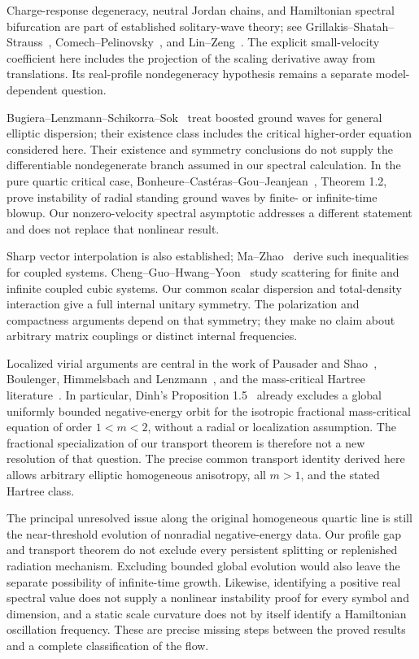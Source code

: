 \documentclass[11pt,a4paper]{article}
\theoremstyle{remark}\newtheorem{remark}[theorem]{Remark}
\begin{document}
Charge-response degeneracy, neutral Jordan chains, and Hamiltonian
spectral bifurcation are part of established solitary-wave theory;
see Grillakis--Shatah--Strauss~\cite{GSS},
Comech--Pelinovsky~\cite{CP}, and Lin--Zeng~\cite{LZ}.
The explicit small-velocity coefficient here includes the projection of
the scaling derivative away from translations. Its real-profile
nondegeneracy hypothesis remains a separate model-dependent question.

Bugiera--Lenzmann--Schikorra--Sok~\cite{BLSS} treat boosted ground
waves for general elliptic dispersion; their existence class includes
the critical higher-order equation considered here. Their existence
and symmetry conclusions do not supply the differentiable nondegenerate
branch assumed in our spectral calculation. In the pure quartic critical
case, Bonheure--Cast\'eras--Gou--Jeanjean~\cite{BCGJinst}, Theorem 1.2,
prove instability of radial standing ground waves by finite- or
infinite-time blowup. Our nonzero-velocity spectral asymptotic addresses
a different statement and does not replace that nonlinear result.

Sharp vector interpolation is also established; Ma--Zhao~\cite{MZ}
derive such inequalities for coupled systems.
Cheng--Guo--Hwang--Yoon~\cite{CGHY} study scattering for finite and
infinite coupled cubic systems. Our common scalar dispersion and
total-density interaction give a full internal unitary symmetry.
The polarization and compactness arguments depend on that symmetry;
they make no claim about arbitrary matrix couplings or distinct internal
frequencies.

Localized virial arguments are central in the work of
Pausader and Shao~\cite{PS}, Boulenger, Himmelsbach and Lenzmann~\cite{BHL},
and the mass-critical Hartree literature~\cite{CHKL}.
In particular, Dinh's Proposition 1.5~\cite{Dinh} already excludes a
global uniformly bounded negative-energy orbit for the isotropic
fractional mass-critical equation of order $1<m<2$, without a radial
or localization assumption. The fractional specialization of our
transport theorem is therefore not a new resolution of that question.
The precise common transport identity derived here allows arbitrary
elliptic homogeneous anisotropy, all $m>1$, and the stated Hartree class.

The principal unresolved issue along the original homogeneous quartic
line is still the near-threshold evolution of nonradial negative-energy
data. Our profile gap and transport theorem do not exclude every
persistent splitting or replenished radiation mechanism. Excluding
bounded global evolution would also leave the separate possibility of
infinite-time growth. Likewise, identifying a positive real spectral
value does not supply a nonlinear instability proof for every symbol
and dimension, and a static scale curvature does not by itself identify
a Hamiltonian oscillation frequency. These are precise missing steps
between the proved results and a complete classification of the flow.
\end{document}
